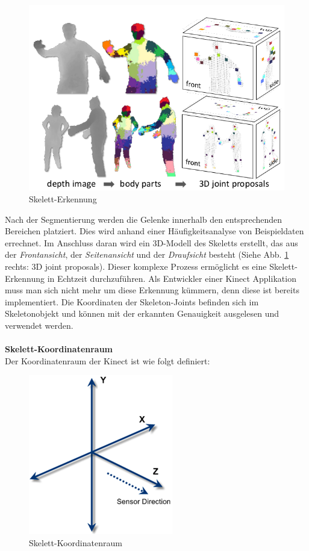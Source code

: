 \begin{figure}[H]						
	\centering							
	\includegraphics[scale=0.5]{Bilder/kinect_body_parts.png}			
	\caption{Skelett-Erkennung \cite{pdf:realtime_human_pose}}						
	\label{f:kinect_skeleton}						
\end{figure}

\noindent
Nach der Segmentierung werden die Gelenke innerhalb den entsprechenden Bereichen platziert. Dies wird anhand einer Häufigkeitsanalyse von Beispieldaten errechnet.
Im Anschluss daran wird ein 3D-Modell des Skeletts erstellt, das aus der \textit{Frontansicht}, der \textit{Seitenansicht} und der \textit{Draufsicht} besteht (Siehe Abb. \ref{f:kinect_skeleton} rechts: 3D joint proposals).
Dieser komplexe Prozess ermöglicht es eine Skelett-Erkennung in Echtzeit durchzuführen. Als Entwickler einer Kinect Applikation muss man sich nicht mehr um diese Erkennung kümmern, denn diese  ist bereits implementiert.
Die Koordinaten der Skeleton-Joints befinden sich im Skeletonobjekt und können mit der erkannten Genauigkeit ausgelesen und verwendet werden.
\\ \\
\textbf{Skelett-Koordinatenraum}\\
Der Koordinatenraum der Kinect ist wie folgt definiert:

\begin{figure}[H]						
	\centering							
	\includegraphics[scale=0.8]{Bilder/kinect_skeleton_space.png}			
	\caption{Skelett-Koordinatenraum\cite{ws:microsoft_coordinateSpaces}}						
	\label{f:kinect_skeleton_space}						
\end{figure}

